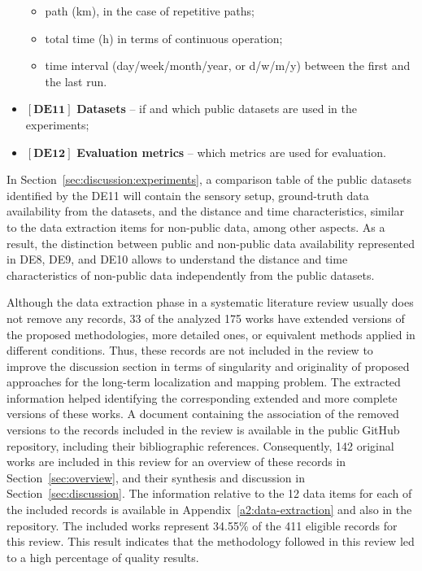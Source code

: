 \begin{itemize}[nosep]
\begin{itemize}[nosep]
  \item path (km), in the case of repetitive paths;
  \item total time (h) in terms of continuous operation;
  \item time interval (day/week/month/year, or d/w/m/y) between the first and the last run.
  \end{itemize}
\item $\left[\textbf{DE11}\right]$ \textbf{Datasets} -- if and which public datasets are used in the experiments;
\item $\left[\textbf{DE12}\right]$ \textbf{Evaluation metrics} -- which metrics are used for evaluation.
\end{itemize}

In Section~\ref{sec:discussion:experiments}, a comparison table of the public datasets identified by the DE11 will contain the sensory setup, ground-truth data availability from the datasets, and the distance and time characteristics, similar to the data extraction items for non-public data, among other aspects. As a result, the distinction between public and non-public data availability represented in DE8, DE9, and DE10 allows to understand the distance and time characteristics of non-public data independently from the public datasets.

Although the data extraction phase in a systematic literature review usually does not remove any records, 33 of the analyzed 175 works have extended versions of the proposed methodologies, more detailed ones, or equivalent methods applied in different conditions.
Thus, these records are not included in the review to improve the discussion section in terms of singularity and originality of proposed approaches for the long-term localization and mapping problem.
The extracted information helped identifying the corresponding extended and more complete versions of these works.
A document containing the association of the removed versions to the records included in the review is available in the public GitHub repository, including their bibliographic references. 
Consequently, 142 original works are included in this review for an overview of these records in Section~\ref{sec:overview}, and their synthesis and discussion in Section~\ref{sec:discussion}. The information relative to the 12 data items for each of the included records is available in Appendix~\ref{a2:data-extraction} and also in the repository. The included works represent 34.55\% of the 411 eligible records for this review. This result indicates that the methodology followed in this review led to a high percentage of quality results.

